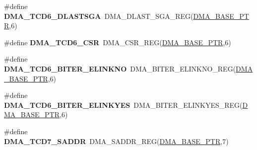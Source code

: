 \begin{DoxyCompactItemize}
\item 
\hypertarget{group___d_m_a___register___accessor___macros_ga462831fecef10ad2b3be07101cc4a0cb}{}\#define {\bfseries D\+M\+A\+\_\+\+T\+C\+D6\+\_\+\+D\+L\+A\+S\+T\+S\+G\+A}~D\+M\+A\+\_\+\+D\+L\+A\+S\+T\+\_\+\+S\+G\+A\+\_\+\+R\+E\+G(\hyperlink{group___d_m_a___peripheral_ga6997fbc1b1973e9f27170217a3bd6f22}{D\+M\+A\+\_\+\+B\+A\+S\+E\+\_\+\+P\+T\+R},6)\label{group___d_m_a___register___accessor___macros_ga462831fecef10ad2b3be07101cc4a0cb}

\item 
\hypertarget{group___d_m_a___register___accessor___macros_gaafd4e9ae86d78c4a625a97dbf5871935}{}\#define {\bfseries D\+M\+A\+\_\+\+T\+C\+D6\+\_\+\+C\+S\+R}~D\+M\+A\+\_\+\+C\+S\+R\+\_\+\+R\+E\+G(\hyperlink{group___d_m_a___peripheral_ga6997fbc1b1973e9f27170217a3bd6f22}{D\+M\+A\+\_\+\+B\+A\+S\+E\+\_\+\+P\+T\+R},6)\label{group___d_m_a___register___accessor___macros_gaafd4e9ae86d78c4a625a97dbf5871935}

\item 
\hypertarget{group___d_m_a___register___accessor___macros_ga48649fc22420475f667d80c10c46ed68}{}\#define {\bfseries D\+M\+A\+\_\+\+T\+C\+D6\+\_\+\+B\+I\+T\+E\+R\+\_\+\+E\+L\+I\+N\+K\+N\+O}~D\+M\+A\+\_\+\+B\+I\+T\+E\+R\+\_\+\+E\+L\+I\+N\+K\+N\+O\+\_\+\+R\+E\+G(\hyperlink{group___d_m_a___peripheral_ga6997fbc1b1973e9f27170217a3bd6f22}{D\+M\+A\+\_\+\+B\+A\+S\+E\+\_\+\+P\+T\+R},6)\label{group___d_m_a___register___accessor___macros_ga48649fc22420475f667d80c10c46ed68}

\item 
\hypertarget{group___d_m_a___register___accessor___macros_ga6fb4f9b6a33d34236f2d0dbaabbe44b1}{}\#define {\bfseries D\+M\+A\+\_\+\+T\+C\+D6\+\_\+\+B\+I\+T\+E\+R\+\_\+\+E\+L\+I\+N\+K\+Y\+E\+S}~D\+M\+A\+\_\+\+B\+I\+T\+E\+R\+\_\+\+E\+L\+I\+N\+K\+Y\+E\+S\+\_\+\+R\+E\+G(\hyperlink{group___d_m_a___peripheral_ga6997fbc1b1973e9f27170217a3bd6f22}{D\+M\+A\+\_\+\+B\+A\+S\+E\+\_\+\+P\+T\+R},6)\label{group___d_m_a___register___accessor___macros_ga6fb4f9b6a33d34236f2d0dbaabbe44b1}

\item 
\hypertarget{group___d_m_a___register___accessor___macros_ga2c17a6742312a4098c6492219ff8807e}{}\#define {\bfseries D\+M\+A\+\_\+\+T\+C\+D7\+\_\+\+S\+A\+D\+D\+R}~D\+M\+A\+\_\+\+S\+A\+D\+D\+R\+\_\+\+R\+E\+G(\hyperlink{group___d_m_a___peripheral_ga6997fbc1b1973e9f27170217a3bd6f22}{D\+M\+A\+\_\+\+B\+A\+S\+E\+\_\+\+P\+T\+R},7)\label{group___d_m_a___register___accessor___macros_ga2c17a6742312a4098c6492219ff8807e}


\end{DoxyCompactItemize}

